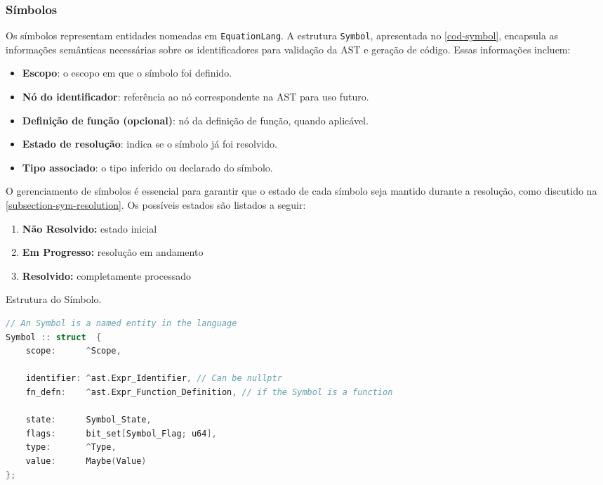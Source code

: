 \subsubsection{Símbolos}

Os símbolos representam entidades nomeadas em \texttt{EquationLang}. A estrutura \texttt{Symbol}, apresentada no \autoref{cod-symbol}, encapsula as informações semânticas necessárias sobre os identificadores para validação da AST e geração de código. Essas informações incluem: \begin{itemize} \item \textbf{Escopo}: o escopo em que o símbolo foi definido. \item \textbf{Nó do identificador}: referência ao nó correspondente na AST para uso futuro. \item \textbf{Definição de função (opcional)}: nó da definição de função, quando aplicável. \item \textbf{Estado de resolução}: indica se o símbolo já foi resolvido. \item \textbf{Tipo associado}: o tipo inferido ou declarado do símbolo. \end{itemize}

O gerenciamento de símbolos é essencial para garantir que o estado de cada símbolo seja mantido durante a resolução, como discutido na \autoref{subsection-sym-resolution}. Os possíveis estados são listados a seguir:
\begin{enumerate}
    \item \textbf{Não Resolvido:} estado inicial
    \item \textbf{Em Progresso:} resolução em andamento
    \item \textbf{Resolvido:} completamente processado
\end{enumerate}

\begin{codigo}[H]
    \caption{\small Estrutura do Símbolo.}
    \label{cod-symbol}
\begin{lstlisting}[language=C, numbers=none, frame=none, inputencoding=latin1]
// An Symbol is a named entity in the language
Symbol :: struct  {
    scope:      ^Scope,

    identifier: ^ast.Expr_Identifier, // Can be nullptr
    fn_defn:    ^ast.Expr_Function_Definition, // if the Symbol is a function

    state:      Symbol_State,
    flags:      bit_set[Symbol_Flag; u64],
    type:       ^Type,
    value:      Maybe(Value)
};

\end{lstlisting}
\end{codigo}


